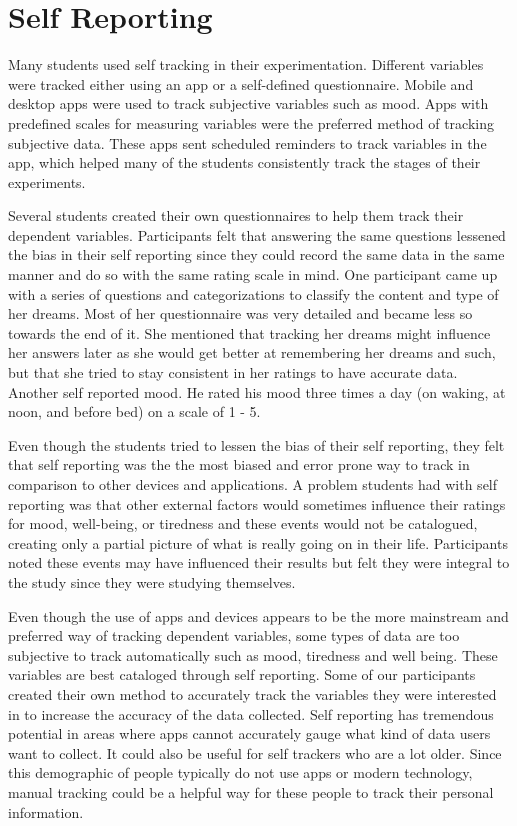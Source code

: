 \section{Self Reporting}
Many students used self tracking in their experimentation. Different variables were tracked either using an app or a self-defined questionnaire. Mobile and desktop apps were used to track subjective variables such as mood. Apps with predefined scales for measuring variables were the preferred method of tracking subjective data. These apps sent scheduled reminders to track variables in the app, which helped many of the students consistently track the stages of their experiments. 

Several students created their own questionnaires to help them track their dependent variables. 
Participants felt that answering the same questions lessened the bias in their self reporting since they could record the same data in the same manner and do so with the same rating scale in mind. One participant came up with a series of questions and categorizations to classify the content and type of her dreams. Most of her questionnaire was very detailed and became less so towards the end of it. She mentioned that tracking her dreams might influence her answers later as she would get better at remembering her dreams and such, but that she tried to stay consistent in her ratings to have accurate data. Another self reported mood. He rated his mood three times a day (on waking, at noon, and before bed) on a scale of 1 - 5. 

Even though the students tried to lessen the bias of their self reporting, they felt that self reporting was the the most biased and error prone way to track in comparison to other devices and applications. A problem students had with self reporting was that other external factors would sometimes influence their ratings for mood, well-being, or tiredness and these events would not be catalogued, creating only a partial picture of what is really going on in their life. Participants noted these events may have influenced their results but felt they were integral to the study since they were studying themselves.

Even though the use of apps and devices appears to be the more mainstream and preferred way of tracking dependent variables, some types of data are too subjective to track automatically such as mood, tiredness and well being. These variables are best cataloged through self reporting. Some of our participants created their own method to accurately track the variables they were interested in to increase the accuracy of the data collected. Self reporting has tremendous potential in areas where apps cannot accurately gauge what kind of data users want to collect. It could also be useful for self trackers who are a lot older. Since this demographic of people typically do not use apps or modern technology, manual tracking could be a helpful way for these people to track their personal information. 
